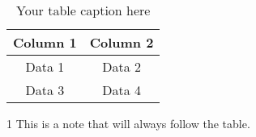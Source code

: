 \documentclass{article}
\begin{document}
\begin{table}
    \begin{threeparttable}
        \caption{Your table caption here}
        \begin{tabular}{cc}
            \hline
            Column 1 & Column 2 \\
            \hline
            Data 1 & Data 2 \\
            Data 3 & Data 4 \\
            \hline
        \end{tabular}
        \begin{tablenotes}
            \item[1] This is a note that will always follow the table.
        \end{tablenotes}
    \end{threeparttable}
\end{table}
\end{document}
